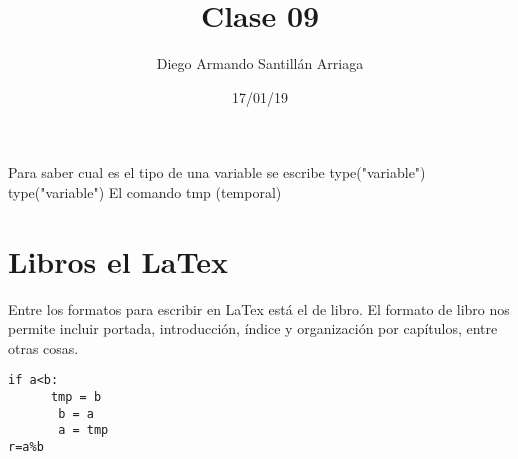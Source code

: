 \documentclass[letterpaper, 12pt, oneside]{article}%
\title{\Huge Clase 09}
\author{Diego Armando Santillán Arriaga}
\date{17/01/19}
\begin{document}
	\maketitle
	\newpage
Para saber cual es el tipo de una variable se escribe type("variable")
type("variable")
El comando tmp (temporal) 
\section{Libros el LaTex}
Entre los formatos para escribir en LaTex está el de libro. El formato de libro nos permite incluir portada, introducción, índice y organización por capítulos, entre otras cosas. 
 
\begin{verbatim}
if a<b:
      tmp = b
       b = a
       a = tmp
r=a%b       
\end{verbatim}
\end{document}
